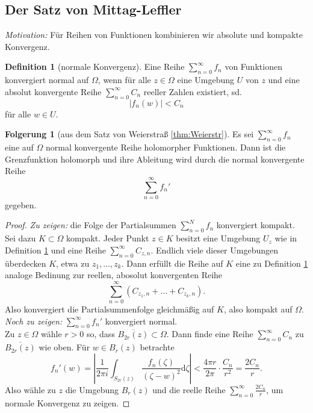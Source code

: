 \documentclass[11pt,titlepage]{article}
\theoremstyle{definition}
\newtheorem{corollary}[theorem]{Folgerung}
\newtheorem{definition}[theorem]{Definition}
\theoremstyle{remark}
\begin{document}
	\subsection{Der Satz von Mittag-Leffler}
	
	\textsl{Motivation:} Für Reihen von Funktionen kombinieren wir absolute und kompakte Konvergenz.
	
	\begin{definition}[normale Konvergenz] \label{def:normKonv}
		Eine Reihe $\sum_{n=0}^{\infty}f_n$ von Funktionen konvergiert normal auf $\Omega$, wenn für alle 
		$z\in\Omega$ eine Umgebung $U$ von $z$ und eine absolut konvergente Reihe
		$\sum_{n=0}^{\infty} C_n$ reeller Zahlen existiert, sd.
		\[ |f_n(w)|<C_n \]
		für alle $w\in U$.
	\end{definition}
	
	\begin{corollary}[aus dem Satz von Weierstraß \ref{thm:Weierstr}]
		Es sei $\sum_{n=0}^{\infty}f_n$ eine auf $\Omega$ normal konvergente Reihe holomorpher Funktionen. 
		Dann ist die Grenzfunktion holomorph und ihre Ableitung wird durch die normal konvergente Reihe
		\[ \sum_{n=0}^{\infty} f_n' \]
		gegeben.
	\end{corollary}
	
	\begin{proof}
		\textsl{Zu zeigen:} die Folge der Partialsummen $\sum_{n=0}^N f_n$ konvergiert kompakt. \\
		Sei dazu $K\subset\Omega$ kompakt. Jeder Punkt $z\in K$ besitzt eine Umgebung $U_z$ wie in Definition 
		\ref{def:normKonv} und eine Reihe $\sum_{n=0}^{\infty} C_{z,n}$. Endlich viele dieser Umgebungen 
		überdecken $K$, etwa zu $z_1,\ldots,z_k$. Dann erfüllt die Reihe auf $K$ eine zu Definition 
		\ref{def:normKonv} analoge Bedinung zur reellen, abosolut konvergenten Reihe 
		\[ \sum_{n=0}^{\infty} (C_{z_1,n}+\ldots+C_{z_k,n}). \]
		Also konvergiert die Partialsummenfolge gleichmäßig auf $K$, also kompakt auf $\Omega$. \\
		\textsl{Noch zu zeigen:} $\sum_{n=0}^{\infty} f_n'$ konvergiert normal. \\
		Zu $z\in\Omega$ wähle $r>0$ so, dass $\overline{B_{2r}(z)}\subset\Omega$. Dann finde eine Reihe 
		$\sum_{n=0}^{\infty} C_n$ zu $\overline{B_{2r}(z)}$ wie oben. Für $w\in B_r(z)$ betrachte
		\[ f_n'(w)=\left|\frac{1}{2\pi i} \int_{S_{2r}(z)}\frac{f_n(\zeta)}{(\zeta-w)^2}\mathrm{d}\zeta\right| 
		< \frac{4\pi r}{2\pi}\cdot \frac{C_n}{r^2} =\frac{2C_n}{r} .\]
		Also wähle zu $z$ die Umgebung $B_r(z)$ und die reelle Reihe $\sum_{n=0}^{\infty}\frac{2C_n}{r}$, 
		um normale Konvergenz zu zeigen.
	\end{proof}
	
\end{document}
